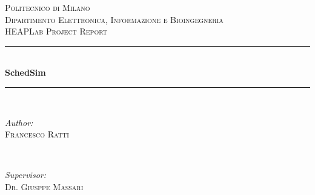 \begin{titlepage}

\newcommand{\HRule}{\rule{\linewidth}{0.5mm}} %

\center %
 

\textsc{\LARGE Politecnico di Milano}\\[1.5cm] %
\textsc{\Large Dipartimento Elettronica, Informazione e Bioingegneria}\\[0.5cm] %
\textsc{\large HEAPLab Project Report}\\[0.5cm] %


\HRule \\[0.4cm]
{ \huge \bfseries SchedSim}\\[0.4cm] %
\HRule \\[1.5cm]
 

\begin{minipage}{0.4\textwidth}
\begin{flushleft} \large
\emph{Author:}\\
\textsc{Francesco Ratti} %
\end{flushleft}
\end{minipage}
~
\begin{minipage}{0.4\textwidth}
\begin{flushright} \large
\emph{Supervisor:} \\
\textsc{Dr. Giusppe Massari} %
\end{flushright}
\end{minipage}\\[2cm]



\end{titlepage}
